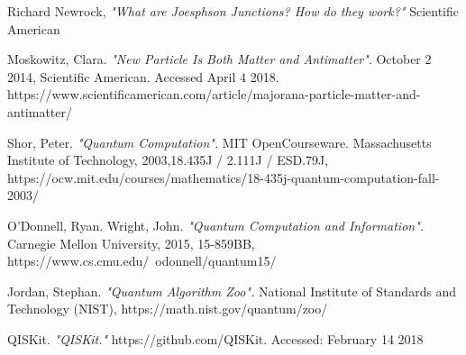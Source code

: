 \documentclass[a4paper]{article}
\begin{document}
\begin{thebibliography}{9}
	




	Richard Newrock,
	\emph{"What are Joesphson Junctions? How do they work?"}
	Scientific American
	
	Moskowitz, Clara. \emph{"New Particle Is Both Matter and Antimatter"}. October 2 2014, Scientific American. Accessed April 4 2018. https://www.scientificamerican.com/article/majorana-particle-matter-and-antimatter/


	

	Shor, Peter. \emph{"Quantum Computation".} MIT OpenCourseware. Massachusetts Institute of Technology, 2003,18.435J / 2.111J / ESD.79J, \newline https://ocw.mit.edu/courses/mathematics/18-435j-quantum-computation-fall-2003/

	O'Donnell, Ryan. Wright, John. \emph{"Quantum Computation and Information".} Carnegie Mellon University, 2015, 15-859BB, \newline https://www.cs.cmu.edu/~odonnell/quantum15/

	Jordan, Stephan. \emph{"Quantum Algorithm Zoo".} National Institute of Standards and Technology (NIST),  https://math.nist.gov/quantum/zoo/
	
	QISKit. \emph{"QISKit."} https://github.com/QISKit. Accessed: February 14 2018
\begin{comment} %
https://github.com/QISKit
  https://github.com/QISKit/ibmqx-user-guides
  https://github.com/QISKit/qiskit-tutorial
     https://github.com/QISKit/qiskit-tutorial/blob/master/INSTALL.md
        https://datascience.ibm.com/
        https://medium.com/qiskitters/qiskit-turns-one-looking-back-cbc2c48d7a95
     https://github.com/QISKit/qiskit-tutorial/blob/master/hello_world/quantum_emoticon.ipynb
\end{comment} %


\end{thebibliography}
\end{document}
